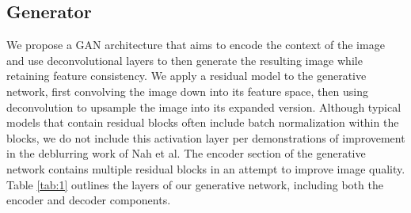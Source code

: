 \documentclass{article}
\begin{document}
\subsection{Generator}
We propose a GAN architecture that aims to encode the context of the image and use deconvolutional layers to then generate the resulting image while retaining feature consistency. We apply a residual model to the generative network, first convolving the image down into its feature space, then using deconvolution to upsample the image into its expanded version. Although typical models that contain residual blocks often include batch normalization within the blocks, we do not include this activation layer per demonstrations of improvement in the deblurring work of Nah et al.\cite{nah_deep_2018} The encoder section of the generative network contains multiple residual blocks in an attempt to improve image quality. Table \ref{tab:1} outlines the layers of our generative network, including both the encoder and decoder components.
\end{document}

